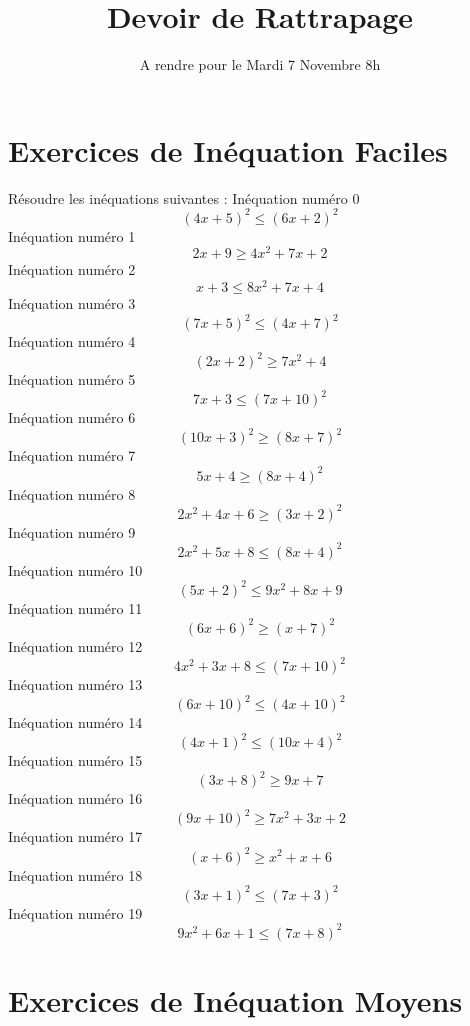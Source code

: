 \documentclass{article}
\title{Devoir de Rattrapage}
\date{A rendre pour le Mardi 7 Novembre 8h}\usepackage{natbib}
\begin{document}
\maketitle
 \section{Exercices de In\'equation Faciles}

 R\'esoudre les in\'equations suivantes : 
In\'equation num\'ero 0 \[\left(4 x + 5\right)^{2} \leq \left(6 x + 2\right)^{2}\]In\'equation num\'ero 1 \[2 x + 9 \geq 4 x^{2} + 7 x + 2\]In\'equation num\'ero 2 \[x + 3 \leq 8 x^{2} + 7 x + 4\]In\'equation num\'ero 3 \[\left(7 x + 5\right)^{2} \leq \left(4 x + 7\right)^{2}\]In\'equation num\'ero 4 \[\left(2 x + 2\right)^{2} \geq 7 x^{2} + 4\]In\'equation num\'ero 5 \[7 x + 3 \leq \left(7 x + 10\right)^{2}\]In\'equation num\'ero 6 \[\left(10 x + 3\right)^{2} \geq \left(8 x + 7\right)^{2}\]In\'equation num\'ero 7 \[5 x + 4 \geq \left(8 x + 4\right)^{2}\]In\'equation num\'ero 8 \[2 x^{2} + 4 x + 6 \geq \left(3 x + 2\right)^{2}\]In\'equation num\'ero 9 \[2 x^{2} + 5 x + 8 \leq \left(8 x + 4\right)^{2}\]In\'equation num\'ero 10 \[\left(5 x + 2\right)^{2} \leq 9 x^{2} + 8 x + 9\]In\'equation num\'ero 11 \[\left(6 x + 6\right)^{2} \geq \left(x + 7\right)^{2}\]In\'equation num\'ero 12 \[4 x^{2} + 3 x + 8 \leq \left(7 x + 10\right)^{2}\]In\'equation num\'ero 13 \[\left(6 x + 10\right)^{2} \leq \left(4 x + 10\right)^{2}\]In\'equation num\'ero 14 \[\left(4 x + 1\right)^{2} \leq \left(10 x + 4\right)^{2}\]In\'equation num\'ero 15 \[\left(3 x + 8\right)^{2} \geq 9 x + 7\]In\'equation num\'ero 16 \[\left(9 x + 10\right)^{2} \geq 7 x^{2} + 3 x + 2\]In\'equation num\'ero 17 \[\left(x + 6\right)^{2} \geq x^{2} + x + 6\]In\'equation num\'ero 18 \[\left(3 x + 1\right)^{2} \leq \left(7 x + 3\right)^{2}\]In\'equation num\'ero 19 \[9 x^{2} + 6 x + 1 \leq \left(7 x + 8\right)^{2}\]
 \section{Exercices de In\'equation Moyens}
\end{document}
